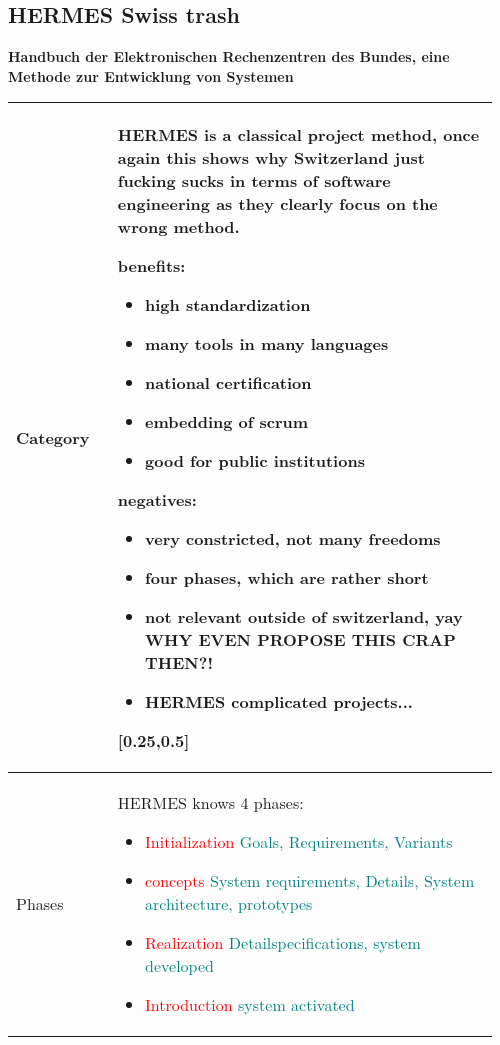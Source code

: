 \documentclass[main.tex,fontsize=8pt,paper=a4,paper=portrait,DIV=calc,]{scrartcl}
\begin{document}
\begin{table}[h!]
\subsection{HERMES Swiss trash}
\textbf{Handbuch der Elektronischen Rechenzentren des Bundes, eine Methode zur
Entwicklung von Systemen}
\begin{tabular}{|m{0.2\linewidth}|m{0.755\linewidth}|}
\hline
Category & HERMES is a classical project method, once again this shows why Switzerland just fucking sucks in terms of software engineering as they clearly focus on the wrong method.\newline
\minipg{
benefits:\newline
\begin{itemize}
\item high standardization
\item many tools in many languages
\item national certification
\item embedding of scrum
\item good for public institutions
\end{itemize}
}
{
negatives:\newline
\begin{itemize}
\item very constricted, not many freedoms
\item four phases, which are rather short
\item not relevant outside of switzerland, yay WHY EVEN PROPOSE THIS CRAP THEN?!
\item HERMES complicated projects...
\end{itemize}
}[0.25,0.5]\\
\hline
Phases & 
HERMES knows 4 phases:\newline
\begin{itemize}
  \item \textcolor{red}{Initialization} \textcolor{teal}{Goals, Requirements, Variants}
  \item \textcolor{red}{concepts} \textcolor{teal}{System requirements, Details, System architecture, prototypes}
  \item \textcolor{red}{Realization} \textcolor{teal}{Detailspecifications, system developed}
  \item \textcolor{red}{Introduction} \textcolor{teal}{system activated}
  \vspace{-3mm}
\end{itemize}\\
\hline
\end{tabular}
\end{table}
\end{document}
